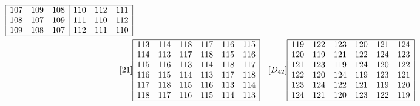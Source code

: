 \documentclass[12pt,a4paper]{amsart}
\begin{document}
\begin{align*}
\begin{array}{|rrr|rrr|}
\hline
107&109&108&110&112&111\\%
108&107&109&111&110&112\\%
109&108&107&112&111&110\\%
\hline
\end{array}\\
[21] &
\begin{array}{|rrrrrr|}%
\hline
113&114&118&117&116&115\\%
114&113&117&118&115&116\\%
115&116&113&114&118&117\\%
116&115&114&113&117&118\\%
117&118&115&116&113&114\\%
118&117&116&115&114&113\\%
\hline
\end{array} &
[D_{42}] &
\begin{array}{|rrrrrr|}%
\hline
119&122&123&120&121&124\\%
120&119&121&122&124&123\\%
121&123&119&124&120&122\\%
122&120&124&119&123&121\\%
123&124&122&121&119&120\\%
124&121&120&123&122&119\\%
\hline
\end{array}\\
\end{align*}
\newpage
\vspace*{-10mm}
\scriptsize
\end{document}
